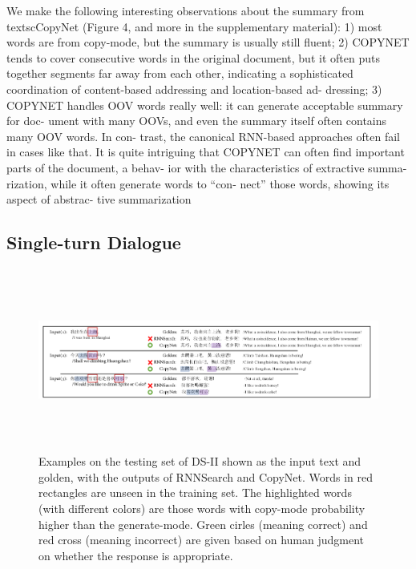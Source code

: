 \documentclass[UTF8]{ctexart}
\begin{document}
We make the following interesting observations
about the summary from textscCopyNet (Figure 4,
and more in the supplementary material): 1) most
words are from copy-mode, but the summary is
usually still fluent; 2) COPYNET tends to cover
consecutive words in the original document, but it
often puts together segments far away from each
other, indicating a sophisticated coordination of
content-based addressing and location-based ad-
dressing; 3) COPYNET handles OOV words really
well: it can generate acceptable summary for doc-
ument with many OOVs, and even the summary
itself often contains many OOV words. In con-
trast, the canonical RNN-based approaches often
fail in cases like that.
It is quite intriguing that COPYNET can often
find important parts of the document, a behav-
ior with the characteristics of extractive summa-
rization, while it often generate words to “con-
nect” those words, showing its aspect of abstrac-
tive summarization

 
    \subsection{Single-turn Dialogue}


    \begin{figure}[htbp]
        \centering
        \vspace{-0.35cm} 
        \includegraphics[width=13cm,height=6cm]{pictures/dh.jpg}
        \caption{ Examples on the testing set of DS-II shown as the input text and golden, with the outputs
        of RNNSearch and CopyNet. Words in red rectangles are unseen in the training set. The highlighted
        words (with different colors) are those words with copy-mode probability higher than the generate-mode.
        Green cirles (meaning correct) and red cross (meaning incorrect) are given based on human judgment on
        whether the response is appropriate. }
    \end{figure}
\end{document}
